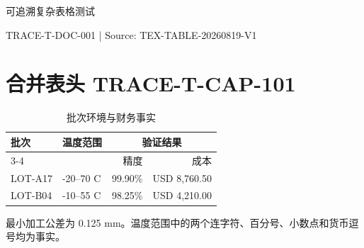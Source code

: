 \documentclass[10pt,a4paper]{ctexart}
\begin{document}
\begin{center}
{\LARGE 可追溯复杂表格测试}\par
{\small TRACE-T-DOC-001 | Source: TEX-TABLE-20260819-V1}
\end{center}

\section{合并表头 TRACE-T-CAP-101}
\begin{table}[h]
\centering
\caption{批次环境与财务事实}
\begin{tabular}{llrr}
\toprule
\multirow{2}{*}{批次} & \multirow{2}{*}{温度范围} & \multicolumn{2}{c}{验证结果} \\
\cmidrule(lr){3-4}
 & & 精度 & 成本 \\
\midrule
LOT-A17 & -20--70 C & 99.90\% & USD 8,760.50 \\
LOT-B04 & -10--55 C & 98.25\% & USD 4,210.00 \\
\bottomrule
\end{tabular}
\end{table}

最小加工公差为 0.125 mm。温度范围中的两个连字符、百分号、小数点和货币逗号均为事实。
\end{document}
